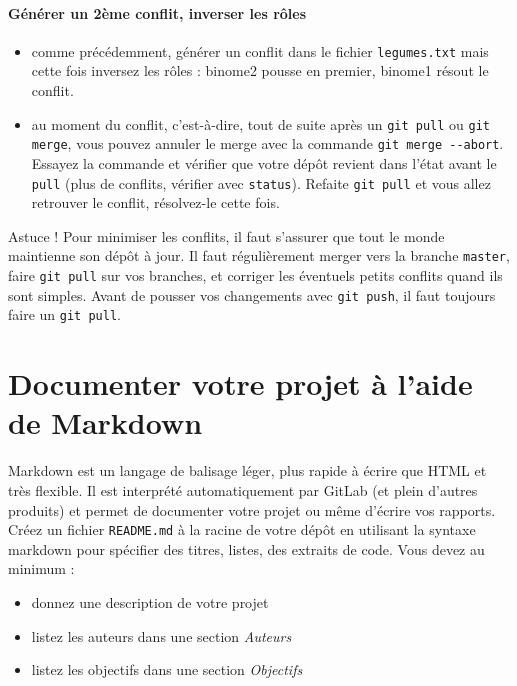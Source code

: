 \documentclass[final, a4paper, openbib, ]{article}
\begin{document}
\paragraph{Générer un 2ème conflit, inverser les rôles}
\begin{itemize}
\item comme précédemment, générer un conflit dans le fichier \texttt{legumes.txt} mais cette fois inversez les rôles :  binome2 pousse en premier, binome1 résout le conflit.
\item au moment du conflit, c'est-à-dire, tout de suite après un \texttt{git pull} ou \texttt{git merge}, vous pouvez annuler le merge avec la commande \texttt{git merge \texttt{-}{}-abort}.
Essayez la commande et vérifier que votre dépôt revient dans l'état avant le \texttt{pull} (plus de conflits, vérifier avec \texttt{status}).
Refaite \texttt{git pull} et vous allez retrouver le conflit, résolvez-le cette fois.
\end{itemize}

\begin{alertinfo3}{Astuce !}
Pour minimiser les conflits, il faut s'assurer que tout le monde maintienne son dépôt à jour.
Il faut régulièrement merger vers la branche \texttt{master}, faire \texttt{git pull} sur vos branches, et corriger les éventuels petits conflits quand ils sont simples.
Avant de pousser vos changements avec \texttt{git push}, il faut toujours faire un \texttt{git pull}.
\end{alertinfo3}

\section{Documenter votre projet à l'aide de Markdown}

Markdown est un langage de balisage léger, plus rapide à écrire que HTML et très flexible.
Il est interprété automatiquement par GitLab (et plein d'autres produits) et permet de documenter votre projet ou même d'écrire vos rapports.\\

Créez un fichier \texttt{README.md} à la racine de votre dépôt en utilisant la syntaxe markdown pour spécifier des titres, listes, des extraits de code.
Vous devez au minimum :
	\begin{itemize}
	\item donnez une description de votre projet
	\item listez les auteurs dans une section \textit{Auteurs}
	\item listez les objectifs dans une section \textit{Objectifs}\\
	\end{itemize}
\end{document}
